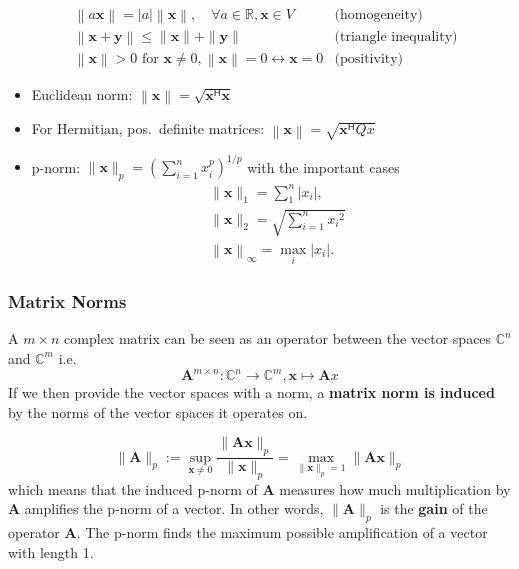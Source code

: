 \begin{align*}
     & \left\| a\mathbf{x}\right\|  =\left|a\right|\left\|\mathbf{x}\right\|,\quad\forall a\in\mathbb{R},\mathbf{x}\in V                 & \text{(homogeneity)}         \\
     & \left\|\mathbf{x}+\mathbf{y}\right\|                         \leq\|\mathbf{x}\|+\|\mathbf{y}\|                                    & \text{(triangle inequality)} \\
     & \left\|\mathbf{x}\right\|                >0 \text{ for } \mathbf{x}\neq0, \left\|\mathbf{x}\right\|=0\leftrightarrow \mathbf{x}=0 & \text{(positivity)}
\end{align*}

\begin{itemize}
    \item Euclidean norm: $\left\|\mathbf{x}\right\|=\sqrt{\mathbf{x}^{\mathsf{H}}\mathbf{x}}$
    \item For Hermitian, pos.\ definite matrices: $\left\|\mathbf{x}\right\|=\sqrt{\mathbf{x}^{\mathsf{H}} Qx}$
    \item p-norm: $\|\mathbf{x}\|_p{=\left(\sum_{i=1}^n x_i^p\right)}^{1/p}$ with the important cases
          \begin{align*}
               & \|\mathbf{x}\|_1=\sum_1^n\left|x_i\right|,               \\
               & \|\mathbf{x}\|_2=\sqrt{\sum_{i=1}^n {x_i}^2}             \\
               & \left\|\mathbf{x}\right\|_\infty=\max_i\left|x_i\right|.
          \end{align*}
\end{itemize}

\subsubsection{Matrix Norms}
A $m\times n$ complex matrix can be seen as an operator between the vector spaces $\mathbb{C}^n$ and $\mathbb{C}^m$ i.e.
\begin{equation*}
    \mathbf{A}^{m\times n}:\mathbb{C}^n\to\mathbb{C}^m,\mathbf{x}\mapsto \mathbf{A}x
\end{equation*}
If we then provide the vector spaces with a norm, a \textbf{matrix norm is induced} by the norms of the vector spaces it operates on.

\begin{equation*}
    \|\mathbf{A}\|_p:=\sup_{\mathbf{x}\neq0}\frac{\|\mathbf{Ax}\|_p}{\|\mathbf{x}\|_p}=\max_{\|\mathbf{x}\|_p=1}\|\mathbf{Ax}\|_p
\end{equation*}
which means that the induced p-norm of $\mathbf{A}$ measures how much multiplication by $\mathbf{A}$ amplifies the p-norm of a vector. In other words, $\|\mathbf{A}\|_p$ is the \textbf{gain} of the operator $\mathbf{A}$. The p-norm finds the maximum possible amplification of a vector with length 1.

